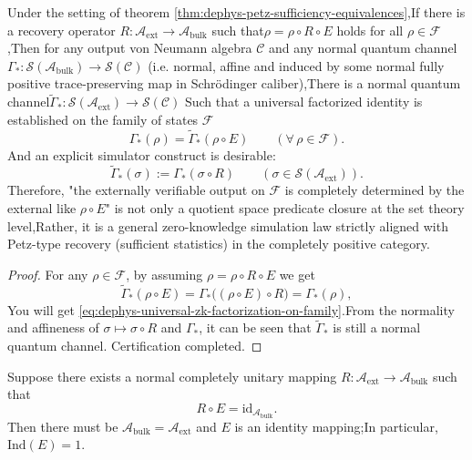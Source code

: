 \begin{corollary}  \label{cor:dephys-universal-zk-simulation-factorization}Under the setting of theorem \ref{thm:dephys-petz-sufficiency-equivalences},If there is a recovery operator \(R:\mathcal{A}_{\mathrm{ext}}\to\mathcal{A}_{\mathrm{bulk}}\) such that\(\rho=\rho\circ R\circ E\) holds for all \(\rho\in\mathcal{F}\),Then for any output von Neumann algebra \(\mathcal{C}\) and any normal quantum channel\(\Gamma_*:\mathcal{S}(\mathcal{A}_{\mathrm{bulk}})\to\mathcal{S}(\mathcal{C})\)
(i.e. normal, affine and induced by some normal fully positive trace-preserving map in Schr\"odinger caliber),There is a normal quantum channel\(\widetilde\Gamma_*:\mathcal{S}(\mathcal{A}_{\mathrm{ext}})\to\mathcal{S}(\mathcal{C})\)
Such that a universal factorized identity is established on the family of states \(\mathcal{F}\)\begin{equation}\label{eq:dephys-universal-zk-factorization-on-family}
\boxed{\;
\Gamma_*(\rho)=\widetilde\Gamma_*(\rho\circ E)\qquad(\forall\,\rho\in\mathcal{F}).\;}
\end{equation}
And an explicit simulator construct is desirable:\[
\boxed{\;
\widetilde\Gamma_*(\sigma):=\Gamma_*(\sigma\circ R)\qquad(\sigma\in\mathcal{S}(\mathcal{A}_{\mathrm{ext}})).\;}
\]
Therefore, "the externally verifiable output on \(\mathcal{F}\) is completely determined by the external like \(\rho\circ E\)" is not only a quotient space predicate closure at the set theory level,Rather, it is a general zero-knowledge simulation law strictly aligned with Petz-type recovery (sufficient statistics) in the completely positive category.\end{corollary}

\begin{proof}
For any \(\rho\in\mathcal{F}\), by assuming \(\rho=\rho\circ R\circ E\) we get\[
\widetilde\Gamma_*(\rho\circ E)
=\Gamma_*\bigl((\rho\circ E)\circ R\bigr)
=\Gamma_*(\rho),
\]
You will get \eqref{eq:dephys-universal-zk-factorization-on-family}.From the normality and affineness of \(\sigma\mapsto \sigma\circ R\) and \(\Gamma_*\), it can be seen that \(\widetilde\Gamma_*\) is still a normal quantum channel. Certification completed.\end{proof}

\begin{corollary}[full state family recoverable \(\Rightarrow\) ordinary vision: \(\mathrm{Ind}(E)=1\)]\label{cor:dephys-full-state-recovery-forces-trivial-index1}Suppose there exists a normal completely unitary mapping \(R:\mathcal{A}_{\mathrm{ext}}\to\mathcal{A}_{\mathrm{bulk}}\) such that\begin{equation}\label{eq:dephys-left-inverse-recovery-map}
\boxed{\;R\circ E=\mathrm{id}_{\mathcal{A}_{\mathrm{bulk}}}.\;}
\end{equation}
Then there must be \(\mathcal{A}_{\mathrm{bulk}}=\mathcal{A}_{\mathrm{ext}}\) and \(E\) is an identity mapping;In particular, \(\mathrm{Ind}(E)=1\).\end{corollary}


